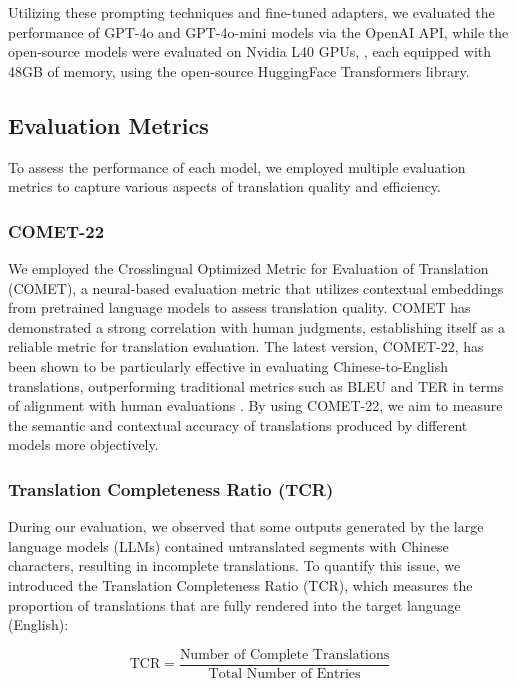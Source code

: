 \documentclass[conference]{IEEEtran}
\begin{document}
Utilizing these prompting techniques and fine-tuned adapters, we evaluated the performance of GPT-4o and GPT-4o-mini models via the OpenAI API, while the open-source models were evaluated on Nvidia L40 GPUs, , each equipped with 48GB of memory, using the open-source HuggingFace Transformers library\cite{wolf2020transformers}.

\subsection{Evaluation Metrics}

To assess the performance of each model, we employed multiple evaluation metrics to capture various aspects of translation quality and efficiency.
\subsubsection{COMET-22}

We employed the Crosslingual Optimized Metric for Evaluation of Translation (COMET), a neural-based evaluation metric that utilizes contextual embeddings from pretrained language models to assess translation quality. COMET has demonstrated a strong correlation with human judgments, establishing itself as a reliable metric for translation evaluation. The latest version, COMET-22, has been shown to be particularly effective in evaluating Chinese-to-English translations, outperforming traditional metrics such as BLEU and TER in terms of alignment with human evaluations \cite{rei2022comet, freitag2022results}. By using COMET-22, we aim to measure the semantic and contextual accuracy of translations produced by different models more objectively.

\subsubsection{Translation Completeness Ratio (TCR)}

During our evaluation, we observed that some outputs generated by the large language models (LLMs) contained untranslated segments with Chinese characters, resulting in incomplete translations. To quantify this issue, we introduced the Translation Completeness Ratio (TCR), which measures the proportion of translations that are fully rendered into the target language (English):

\begin{equation}
\text{TCR} = \frac{\text{Number of Complete Translations}}{\text{Total Number of Entries}}
\end{equation}
\end{document}
